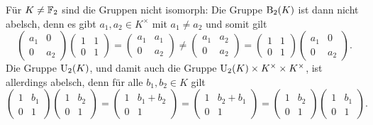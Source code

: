 \begin{solution}
\begin{enumerate}
      Für $K \neq \mathbb{F}_2$ sind die Gruppen nicht isomorph:
      Die Gruppe $\operatorname{B}_2(K)$ ist dann nicht abelsch, denn es gibt $a_1, a_2 \in K^\times$ mit $a_1 \neq a_2$ und somit gilt
      \[
        \begin{pmatrix}
          a_1 & 0   \\
          0   & a_2
        \end{pmatrix}
        \begin{pmatrix}
          1 & 1 \\
          0 & 1
        \end{pmatrix}
        =
        \begin{pmatrix}
          a_1 & a_1 \\
          0   & a_2
        \end{pmatrix}
        \neq
        \begin{pmatrix}
          a_1 & a_2 \\
          0   & a_2
        \end{pmatrix}
        =
        \begin{pmatrix}
          1 & 1 \\
          0 & 1
        \end{pmatrix}
        \begin{pmatrix}
          a_1 & 0   \\
          0   & a_2
        \end{pmatrix}.
      \]
      Die Gruppe $\operatorname{U}_2(K)$, und damit auch die Gruppe $\operatorname{U}_2(K) \times K^\times \times K^\times$, ist allerdings abelsch, denn für alle $b_1, b_2 \in K$ gilt
      \[
        \begin{pmatrix}
          1 & b_1 \\
          0 & 1
        \end{pmatrix}
        \begin{pmatrix}
          1 & b_2 \\
          0 & 1
        \end{pmatrix}
        =
        \begin{pmatrix}
          1 & b_1 + b_2 \\
          0 & 1
        \end{pmatrix}
        =
        \begin{pmatrix}
          1 & b_2 + b_1 \\
          0 & 1
        \end{pmatrix}
        =
        \begin{pmatrix}
          1 & b_2 \\
          0 & 1
        \end{pmatrix}
        \begin{pmatrix}
          1 & b_1 \\
          0 & 1
        \end{pmatrix}.
      \]
  \end{enumerate}
\end{solution}


